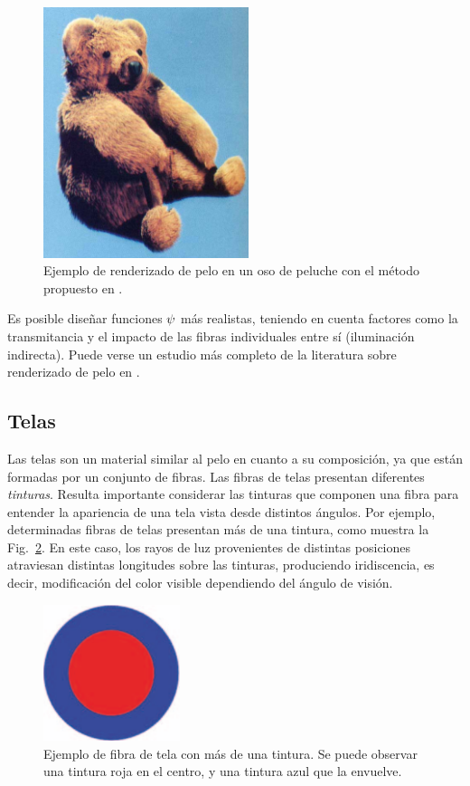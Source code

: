 \begin{figure}
\center
\includegraphics[width=6cm]{figures/osopelo}
\caption[Renderizado de pelo en un oso de peluche]{Ejemplo de renderizado de pelo en un oso de peluche con el método propuesto en \cite{Kajiya1989}.}
\label{fg:osopelo}
\end{figure}


Es posible diseñar funciones $\bold{\psi}$ más realistas, teniendo en cuenta factores como la transmitancia y el impacto de las fibras individuales entre sí (iluminación indirecta).
Puede verse un estudio más completo de la literatura sobre renderizado de pelo en \cite{Ward2007}.

\subsection{Telas}
Las telas son un material similar al pelo en cuanto a su composición, ya que están formadas por un conjunto de fibras.
Las fibras de telas presentan diferentes {\em tinturas}.
Resulta importante considerar las tinturas que componen una fibra para entender la apariencia de una tela vista desde distintos ángulos.
Por ejemplo, determinadas fibras de telas presentan más de una tintura, como muestra la Fig.~\ref{fg:fibra}.
En este caso, los rayos de luz provenientes de distintas posiciones atraviesan distintas longitudes sobre las tinturas, produciendo iridiscencia, es decir, modificación del color visible dependiendo del ángulo de visión.

\begin{figure}
\center
\includegraphics[width=4cm]{figures/fibra}
\caption[Ejemplo de fibra de tela con más de una tintura]{Ejemplo de fibra de tela con más de una tintura. Se puede observar una tintura roja en el centro, y una tintura azul que la envuelve.}
\label{fg:fibra}
\end{figure}

